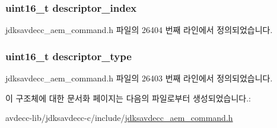 \subsubsection[{\texorpdfstring{descriptor\+\_\+index}{descriptor_index}}]{\setlength{\rightskip}{0pt plus 5cm}uint16\+\_\+t descriptor\+\_\+index}\hypertarget{structjdksavdecc__aem__command__get__counters_a042bbc76d835b82d27c1932431ee38d4}{}\label{structjdksavdecc__aem__command__get__counters_a042bbc76d835b82d27c1932431ee38d4}


jdksavdecc\+\_\+aem\+\_\+command.\+h 파일의 26404 번째 라인에서 정의되었습니다.

\subsubsection[{\texorpdfstring{descriptor\+\_\+type}{descriptor_type}}]{\setlength{\rightskip}{0pt plus 5cm}uint16\+\_\+t descriptor\+\_\+type}\hypertarget{structjdksavdecc__aem__command__get__counters_ab7c32b6c7131c13d4ea3b7ee2f09b78d}{}\label{structjdksavdecc__aem__command__get__counters_ab7c32b6c7131c13d4ea3b7ee2f09b78d}


jdksavdecc\+\_\+aem\+\_\+command.\+h 파일의 26403 번째 라인에서 정의되었습니다.



이 구조체에 대한 문서화 페이지는 다음의 파일로부터 생성되었습니다.\+:\begin{DoxyCompactItemize}
\item 
avdecc-\/lib/jdksavdecc-\/c/include/\hyperlink{jdksavdecc__aem__command_8h}{jdksavdecc\+\_\+aem\+\_\+command.\+h}\end{DoxyCompactItemize}
